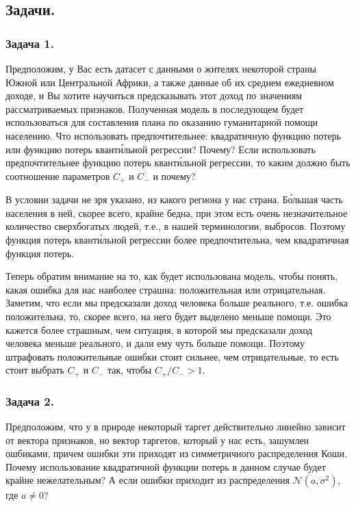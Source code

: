\newpage

\subsection*{Задачи.}

\subsubsection*{Задача 1.}

Предположим, у Вас есть датасет с данными о жителях некоторой страны Южной или Центральной Африки, а также данные об их среднем ежедневном доходе, и Вы хотите научиться предсказывать этот доход по значениям рассматриваемых признаков. Полученная модель в последующем будет использоваться для составления плана по оказанию гуманитарной помощи населению. Что использовать предпочтительнее: квадратичную функцию потерь или функцию потерь квант\'{и}льной регрессии? Почему? Если использовать предпочтительнее функцию потерь квант\'{и}льной регрессии, то каким должно быть соотношение параметров $C_+$ и $C_-$ и почему?

\begin{solution}
    В условии задачи не зря указано, из какого региона у нас страна. Б\'{о}льшая часть населения в ней, скорее всего, крайне бедна, при этом есть очень незначительное количество сверхбогатых людей, т.е., в нашей терминологии, выбросов. Поэтому функция потерь квант\'{и}льной регрессии более предпочтительна, чем квадратичная функция потерь.

    Теперь обратим внимание на то, как будет использована модель, чтобы понять, какая ошибка для нас наиболее страшна: положительная или отрицательная. Заметим, что если мы предсказали доход человека больше реального, т.е. ошибка положительна, то, скорее всего, на него будет выделено меньше помощи. Это кажется более страшным, чем ситуация, в которой мы предсказали доход человека меньше реального, и дали ему чуть больше помощи. Поэтому штрафовать положительные ошибки стоит сильнее, чем отрицательные, то есть стоит выбрать $C_+$ и $C_-$ так, чтобы $C_+/C_- > 1$.
\end{solution}

\subsubsection*{Задача 2.}

Предположим, что у в природе некоторый таргет действительно линейно зависит от вектора признаков, но вектор таргетов, который у нас есть, зашумлен ошбиками, причем ошибки эти приходят из симметричного распределения Коши. Почему использование квадратичной функции потерь в данном случае будет крайне нежелательным? А если ошибки приходит из распределения $\mathcal{N}(a, \sigma^2)$, где $a \neq 0$?

